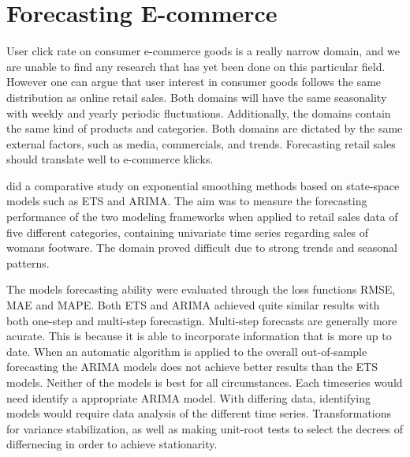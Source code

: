 \section{Forecasting E-commerce}
\label{section:RelatedWork:forecasting-ecommerce}
User click rate on consumer e-commerce goods is a really narrow domain,
and we are unable to find any research that has yet been done on this particular field.
However one can argue that user interest in consumer goods follows the same distribution
as online retail sales.
Both domains will have the same seasonality with weekly and yearly periodic fluctuations.
Additionally, the domains contain the same kind of products and categories.
Both domains are dictated by the same external factors, such as media, commercials, 
and trends.
Forecasting retail sales should translate well to e-commerce klicks.


\cite{Ramos2015} did a comparative study on exponential smoothing methods
based on state-space models such as ETS and ARIMA.
The aim was to measure the forecasting performance of the two modeling frameworks
when applied to retail sales data of five different categories,
containing univariate time series regarding sales of womans footware.
The domain proved difficult due to strong trends and seasonal patterns.

The models forecasting ability were evaluated through the loss functions RMSE, MAE and MAPE.
Both ETS and ARIMA achieved quite similar results with both one-step and multi-step forecastign.
Multi-step forecasts are generally more acurate.
This is because it is able to incorporate information that is more up to date.
When an automatic algorithm is applied to the overall out-of-sample
forecasting the ARIMA models does not achieve better results than the ETS models.
Neither of the models is best for all circumstances.
Each timeseries would need identify a appropriate ARIMA model.
With differing data, identifying models would require data analysis of the different time series.
Transformations for variance stabilization, as well as making unit-root tests to select the decrees of differnecing in order to achieve stationarity.




